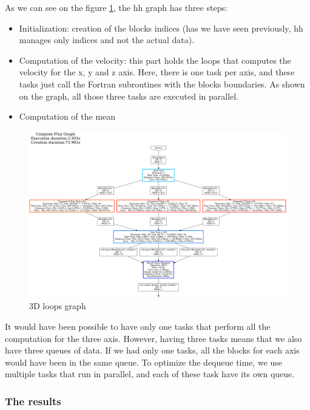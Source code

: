 As we can see on the figure \ref{fig:loopsgraph}, the \gls{hh} graph has three
steps:

\begin{itemize}
  \item Initialization: creation of the blocks indices (has we have seen
    previously, \gls{hh} manages only indices and not the actual data).
  \item Computation of the velocity: this part holds the loops that computes the
    velocity for the x, y and z axis. Here, there is one task per axis, and
    these tasks just call the Fortran subroutines with the blocks boundaries. As
    shown on the graph, all those three tasks are executed in parallel.
  \item Computation of the mean
\end{itemize}
\clearpage{}

\begin{figure}[h!]
  \begin{center}
    \includegraphics[scale=0.2]{img/fds-loops/graph-61.png}
    \caption{3D loops graph}
    \label{fig:loopsgraph}
  \end{center}
\end{figure}

It would have been possible to have only one tasks that perform all the
computation for the three axis. However, having three tasks means that we also
have three queues of data. If we had only one tasks, all the blocks for each
axis would have been in the same queue. To optimize the dequeue time, we use
multiple tasks that run in parallel, and each of these task have its own queue.

\subsubsection{The results}

